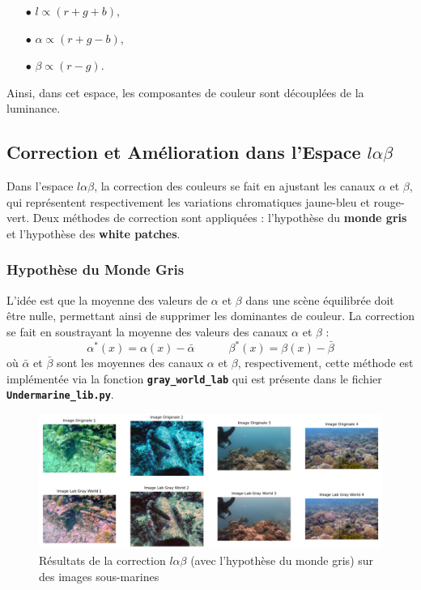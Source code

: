 \documentclass[10pt, a4paper]{extarticle}
\numberwithin{equation}{section}
\numberwithin{figure}{section}
\begin{document}
\begin{itemize}
    \item[$\bullet$] \( l \propto (r + g + b) \),
    \item[$\bullet$] \( \alpha \propto (r + g - b) \),
    \item[$\bullet$] \( \beta \propto(r - g) \).
\end{itemize}
Ainsi, dans cet espace, les composantes de couleur sont découplées de la luminance.


\subsection{Correction et Amélioration dans l'Espace \( l\alpha\beta \)}

Dans l'espace \( l\alpha\beta \), la correction des couleurs se fait en ajustant les canaux \( \alpha \) et \( \beta \), qui représentent respectivement les variations chromatiques jaune-bleu et rouge-vert. Deux méthodes de correction sont appliquées : l'hypothèse du \textbf{monde gris} et l'hypothèse des \textbf{white patches}.

\subsubsection{Hypothèse du Monde Gris}  
   L'idée est que la moyenne des valeurs de \( \alpha \) et \( \beta \) dans une scène équilibrée doit être nulle, permettant ainsi de supprimer les dominantes de couleur. La correction se fait en soustrayant la moyenne des valeurs des canaux \( \alpha \) et \( \beta \) :
   \[
   \alpha^*(x) = \alpha(x) - \bar{\alpha} \quad\quad\quad \beta^*(x) = \beta(x) - \bar{\beta}
   \]
   où \( \bar{\alpha} \) et \( \bar{\beta} \) sont les moyennes des canaux \( \alpha \) et \( \beta \), respectivement, cette méthode est implémentée via la fonction \colorbox{gray!15}{\texttt{\textbf{gray\_world\_lab}}} qui est présente dans le fichier \colorbox{gray!15}{\texttt{\textbf{Undermarine\_lib.py}}}.

\begin{figure}[h!]
\begin{center}
\includegraphics[width=18cm]{image006.png}
\end{center}
\label{figure3.1}
\caption{Résultats de la correction $l\alpha\beta$ (avec l'hypothèse du monde gris) sur des images sous-marines}
\end{figure}  
\end{document}
